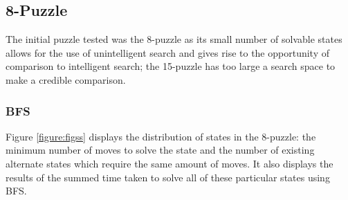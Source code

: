 \documentclass[final]{cmpreport}
\begin{document}
\subsection{8-Puzzle}
The initial puzzle tested was the 8-puzzle as its small number of solvable states allows for the use of unintelligent search and gives rise to the opportunity of comparison to intelligent search; the 15-puzzle has too large a search space to make a credible comparison.






\subsubsection{BFS}

Figure \ref{figure:figss} displays the distribution of states in the 8-puzzle: the minimum number of moves to solve the state and the number of existing alternate states which require the same amount of moves. It also displays the results of the summed time taken to solve all of these particular states using BFS.  
\end{document}
